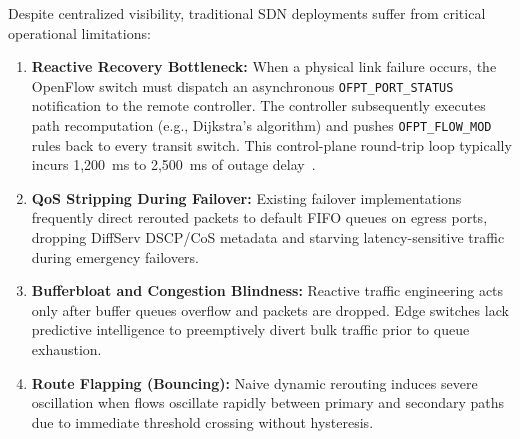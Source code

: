 \documentclass[conference]{IEEEtran}
\begin{document}
Despite centralized visibility, traditional SDN deployments suffer from critical operational limitations:
\begin{enumerate}
    \item \textbf{Reactive Recovery Bottleneck:} When a physical link failure occurs, the OpenFlow switch must dispatch an asynchronous \texttt{OFPT\_PORT\_STATUS} notification to the remote controller. The controller subsequently executes path recomputation (e.g., Dijkstra's algorithm) and pushes \texttt{OFPT\_FLOW\_MOD} rules back to every transit switch. This control-plane round-trip loop typically incurs 1,200~ms to 2,500~ms of outage delay~\cite{kim2013improving}.
    \item \textbf{QoS Stripping During Failover:} Existing failover implementations frequently direct rerouted packets to default FIFO queues on egress ports, dropping DiffServ DSCP/CoS metadata and starving latency-sensitive traffic during emergency failovers.
    \item \textbf{Bufferbloat and Congestion Blindness:} Reactive traffic engineering acts only after buffer queues overflow and packets are dropped. Edge switches lack predictive intelligence to preemptively divert bulk traffic prior to queue exhaustion.
    \item \textbf{Route Flapping (Bouncing):} Naive dynamic rerouting induces severe oscillation when flows oscillate rapidly between primary and secondary paths due to immediate threshold crossing without hysteresis.
\end{enumerate}
\end{document}

